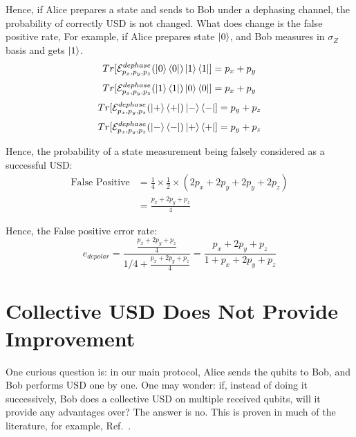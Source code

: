 \documentclass[%
 reprint,
superscriptaddress,
 amsmath,amssymb,
 aps,
]{revtex4-2}
\begin{document}
Hence, if Alice prepares a state and sends to Bob under a dephasing channel, the probability of correctly USD is not changed. What does change is the false positive rate, For example, if Alice prepares state $\ket{0}$, and Bob measures in $\sigma_Z$ basis and gets $\ket{1}$.
\begin{equation}
Tr[\mathcal{E}^{dephase}_{p_x, p_y, p_z}(\ket{0}\bra{0})\ket{1}\bra{1}]=p_x+p_y
\end{equation}
\begin{equation}
Tr[\mathcal{E}^{dephase}_{p_x, p_y, p_z}(\ket{1}\bra{1})\ket{0}\bra{0}]=p_x+p_y
\end{equation}
\begin{equation}
Tr[\mathcal{E}^{dephase}_{p_x, p_y, p_z}(\ket{+}\bra{+})\ket{-}\bra{-}]=p_y+p_z
\end{equation}
\begin{equation}
Tr[\mathcal{E}^{dephase}_{p_x, p_y, p_z}(\ket{-}\bra{-})\ket{+}\bra{+}]=p_y+p_z
\end{equation}

Hence, the probability of a state measurement being falsely considered as a successful USD:
\begin{equation}
\begin{split}
    \text{False Positive}&=\frac{1}{4}\times\frac{1}{2}\times\left(2p_x+2p_y+2p_y+2p_z\right)\\
    &=\frac{p_x+2p_y+p_z}{4}
    \end{split}
\end{equation}

Hence, the False positive error rate:
\begin{equation}
    e_{depolar}=\frac{\frac{p_x+2p_y+p_z}{4}}{1/4+\frac{p_x+2p_y+p_z}{4}}=\frac{p_x+2p_y+p_z}{1+p_x+2p_y+p_z}
\end{equation}

\section{Collective USD Does Not Provide Improvement}

One curious question is: in our main protocol, Alice sends the qubits to Bob, and Bob performs USD one by one. One may wonder: if, instead of doing it successively, Bob does a collective USD on multiple received qubits, will it provide any advantages over? The answer is no. This is proven in much of the literature, for example, Ref.~\cite{USD_one_by_one}.



\end{document}
